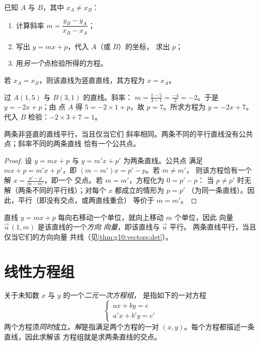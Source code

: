 \begin{method}[求过两点的直线方程]\label{met:g10:lines:through}
已知 $A$ 与 $B$，其中 $x_A \neq x_B$：
\begin{enumerate}
  \item 计算斜率 $m = \dfrac{y_B - y_A}{x_B - x_A}$；
  \item 写出 $y = mx + p$，代入 $A$（或 $B$）的坐标，
        求出 $p$；
  \item 用\emph{另一个}点检验所得的方程。
\end{enumerate}
若 $x_A = x_B$，则该直线为竖直直线，其方程为 $x = x_A$。
\end{method}

\begin{example}\label{ex:g10:lines:through}
过 $A(1, 5)$ 与 $B(3, 1)$ 的直线。斜率：
$m = \frac{1 - 5}{3 - 1} = \frac{-4}{2} = -2$。于是 $y = -2x + p$；由
点 $A$ 得 $5 = -2 \times 1 + p$，故 $p = 7$。所求方程为
$y = -2x + 7$。代入 $B$ 检验：$-2 \times 3 + 7 = 1$。
\end{example}

\begin{proposition}[平行直线]\label{prop:g10:lines:parallel}
两条非竖直的直线平行，当且仅当它们
斜率相同。两条不同的平行直线没有公共点；斜率不同的两条直线
恰有一个公共点。
\end{proposition}

\begin{proof}
设 $y = mx + p$ 与 $y = m'x + p'$ 为两条直线。公共点
满足 $mx + p = m'x + p'$，即 $(m - m')x = p' - p$。若 $m \neq m'$，
则该方程恰有一个解 $x = \frac{p' - p}{m - m'}$，即一个
交点。若 $m = m'$，方程化为 $0 = p' - p$：
当 $p \neq p'$ 时无解（两条不同的平行线）；对每个 $x$ 都成立的情形为 $p = p'$
（为同一条直线）。因此，平行（即没有交点，或两直线重合）
等价于 $m = m'$。
\end{proof}

\begin{remark}[方向向量]
直线 $y = mx + p$ 每向右移动一个单位，就向上移动 $m$ 个单位，因此
向量 $\vec u\,(1, m)$ 是该直线的一个\emph{方向
向量}，即该直线与 $\vec u$ 平行。
两条直线平行，当且仅当它们的方向向量
共线（见\cref{thm:g10:vectors:det}）。
\end{remark}

\section{线性方程组}

\begin{definition}[线性方程组]\label{def:g10:lines:system}
关于未知数 $x$ 与 $y$ 的一个\emph{二元一次方程组}，
是指如下的一对方程
\[
\begin{cases}
a x + b y = c \\
a' x + b' y = c'
\end{cases}
\]
两个方程须\emph{同时}成立。\emph{解}是指满足两个方程的一对
$(x, y)$。每个方程都描述一条直线，因此求解该
方程组就是求两条直线的交点。
\end{definition}

